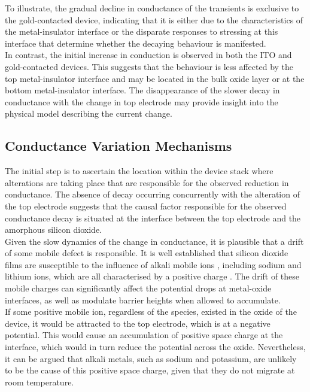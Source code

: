 \noindent To illustrate, the gradual decline in conductance of the transients is exclusive to the gold-contacted device, indicating that it is either due to the characteristics of the metal-insulator interface or the disparate responses to stressing at this interface that determine whether the decaying behaviour is manifested. \\

\noindent In contrast, the initial increase in conduction is observed in both the ITO and gold-contacted devices. This suggests that the behaviour is less affected by the top metal-insulator interface and may be located in the bulk oxide layer or at the bottom metal-insulator interface. The disappearance of the slower decay in conductance with the change in top electrode may provide insight into the physical model describing the current change. 


\subsection[Conductance Variation Mechanisms]{Conductance Variation Mechanisms}

The initial step is to ascertain the location within the device stack where alterations are taking place that are responsible for the observed reduction in conductance. The absence of decay occurring concurrently with the alteration of the top electrode suggests that the causal factor responsible for the observed conductance decay is situated at the interface between the top electrode and the amorphous silicon dioxide. \\

\noindent Given the slow dynamics of the change in conductance, it is plausible that a drift of some mobile defect is responsible. It is well established that silicon dioxide films are susceptible to the influence of alkali mobile ions \cite{snow1965ion}, including sodium and lithium ions, which are all characterised by a positive charge \cite{yon1966sodium}. The drift of these mobile charges can significantly affect the potential drops at metal-oxide interfaces, as well as modulate barrier heights when allowed to accumulate.\\

\noindent If some positive mobile ion, regardless of the species, existed in the oxide of the device, it would be attracted to the top electrode, which is at a negative potential. This would cause an accumulation of positive space charge at the interface, which would in turn reduce the potential across the oxide. Nevertheless, it can be argued that alkali metals, such as sodium and potassium, are unlikely to be the cause of this positive space charge, given that they do not migrate at room temperature. \\


